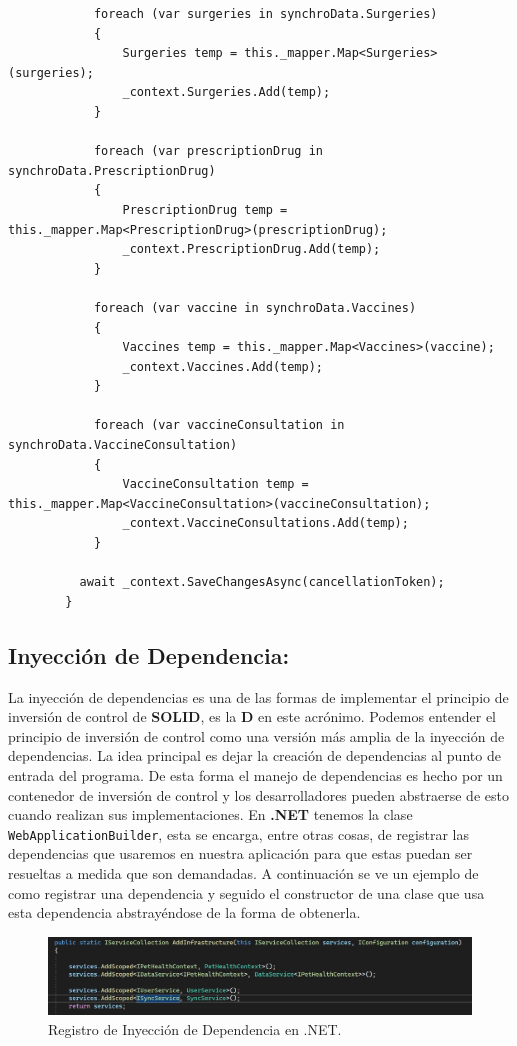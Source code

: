 \begin{lstlisting}
            foreach (var surgeries in synchroData.Surgeries) 
            {
                Surgeries temp = this._mapper.Map<Surgeries>(surgeries);
                _context.Surgeries.Add(temp);
            }

            foreach (var prescriptionDrug in synchroData.PrescriptionDrug)
            {
                PrescriptionDrug temp = this._mapper.Map<PrescriptionDrug>(prescriptionDrug);
                _context.PrescriptionDrug.Add(temp);
            }

            foreach (var vaccine in synchroData.Vaccines)
            {
                Vaccines temp = this._mapper.Map<Vaccines>(vaccine);
                _context.Vaccines.Add(temp);
            }

            foreach (var vaccineConsultation in synchroData.VaccineConsultation)
            {
                VaccineConsultation temp = this._mapper.Map<VaccineConsultation>(vaccineConsultation);
                _context.VaccineConsultations.Add(temp);
            }

          await _context.SaveChangesAsync(cancellationToken);
        }
\end{lstlisting}

\subsection{Inyección de Dependencia:}
La inyección de dependencias es una de las formas de implementar el principio de inversión de control de \textbf{SOLID}, es la \textbf{D} en este acrónimo. Podemos entender el principio de inversión de control como una versión más amplia de la inyección de dependencias. La idea principal es dejar la creación de dependencias al punto de entrada del programa. De esta forma el manejo de dependencias es hecho por un contenedor de inversión de control y los desarrolladores pueden abstraerse de esto cuando realizan sus implementaciones. 
\newline
En \textbf{.NET} tenemos la clase \lstinline{WebApplicationBuilder}, esta se encarga, entre otras cosas, de registrar las dependencias que usaremos en nuestra aplicación para que estas puedan ser resueltas a medida que son demandadas. A continuación se ve un ejemplo de como registrar una dependencia y seguido el constructor de una clase que usa esta dependencia abstrayéndose de la forma de obtenerla.


\begin{figure}[H]
	\centering
	\includegraphics[width = 12cm]{Graphics/di_register_example.jpg}
	\caption{Registro de Inyección de Dependencia en .NET.}
	\label{fig:di_register}
\end{figure}

